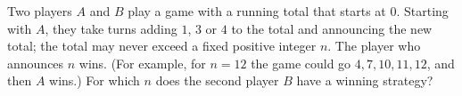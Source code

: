 Two players $A$ and $B$ play a game with a running total that starts at $0$. Starting with $A$, they take turns adding $1$, $3$ or $4$ to the total and announcing the new total; the total may never exceed a fixed positive integer $n$. The player who announces $n$ wins. (For example, for $n=12$ the game could go $4,7,10,11,12$, and then $A$ wins.) For which $n$ does the second player $B$ have a winning strategy?
